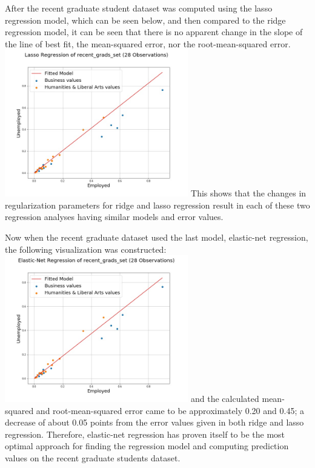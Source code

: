 \documentclass[a4paper,12pt]{IEEEtran}
\begin{document}
After the recent graduate student dataset was computed using the lasso regression model, which can be seen below, and then compared to the ridge regression model, it can be seen that there is no apparent change in the slope of the line of best fit, the mean-squared error, nor the root-mean-squared error. \includegraphics[width=8cm]{lasso_reg_1d_recent_grads_set} This shows that the changes in regularization parameters for ridge and lasso regression result in each of these two regression analyses having similar models and error values.

Now when the recent graduate dataset used the last model, elastic-net regression, the following visualization was constructed: \includegraphics[width=8cm]{en_reg_1d_recent_grads_set} and the calculated mean-squared and root-mean-squared error came to be approximately 0.20 and 0.45; a decrease of about 0.05 points from the error values given in both ridge and lasso regression. Therefore, elastic-net regression has proven itself to be the most optimal approach for finding the regression model and computing prediction values on the recent graduate students dataset.
\end{document}
